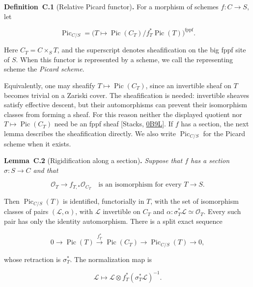 \documentclass[11pt]{article}
\newenvironment{bpstatement}[2]{\par\addvspace{0.6\baselineskip}\noindent\textbf{#1}#2\textbf{.}\enspace\ignorespaces}
  {\par\addvspace{0.4\baselineskip}}
\newenvironment{bpstatementit}[2]{\begin{bpstatement}{#1}{#2}\itshape\ignorespaces}{\end{bpstatement}}
\begin{document}
\label{bp123}%
\begin{bpstatement}{Definition~C.1}{ (Relative Picard functor)}
For a morphism of schemes \(f:C\to S\), let

\[
\operatorname{Pic}_{C/S}
=\bigl(T\longmapsto
\operatorname{Pic}(C_T)/f_T^*\operatorname{Pic}(T)\bigr)^{\mathrm{fppf}}.
\]

Here \(C_T=C\times_ST\), and the superscript denotes sheafification on the big fppf site of \(S\). When this functor is represented by a scheme, we call the representing scheme the \emph{Picard scheme}.
\end{bpstatement}

\label{bp124}%
Equivalently, one may sheafify \(T\mapsto\operatorname{Pic}(C_T)\), since an invertible sheaf on \(T\) becomes trivial on a Zariski cover. The sheafification is needed: invertible sheaves satisfy effective descent, but their automorphisms can prevent their isomorphism classes from forming a sheaf. For this reason neither the displayed quotient nor \(T\mapsto\operatorname{Pic}(C_T)\) need be an fppf sheaf [Stacks, \href{https://stacks.math.columbia.edu/tag/0B9L}{0B9L}]. If \(f\) has a section, the next lemma describes the sheafification directly. We also write \(\operatorname{Pic}_{C/S}\) for the Picard scheme when it exists.

\label{bp125}%
\begin{bpstatementit}{Lemma~C.2}{ (Rigidification along a section)}
Suppose that \(f\) has a section \(\sigma:S\to C\) and that

\[
\mathcal O_T\longrightarrow f_{T,*}\mathcal O_{C_T}
\quad\text{is an isomorphism for every }T\to S.
\tag{$\ast$}
\]

Then \(\operatorname{Pic}_{C/S}(T)\) is identified, functorially in \(T\), with the set of isomorphism classes of pairs \((\mathcal L,\alpha)\), with \(\mathcal L\) invertible on \(C_T\) and \(\alpha:\sigma_T^*\mathcal L\simeq\mathcal O_T\). Every such pair has only the identity automorphism. There is a split exact sequence

\[
0\longrightarrow\operatorname{Pic}(T)
\xrightarrow{f_T^*}\operatorname{Pic}(C_T)
\longrightarrow\operatorname{Pic}_{C/S}(T)
\longrightarrow0,
\]

whose retraction is \(\sigma_T^*\). The normalization map is

\[
\mathcal L\longmapsto
\mathcal L\otimes f_T^*(\sigma_T^*\mathcal L)^{-1}.
\]
\end{bpstatementit}
\end{document}
